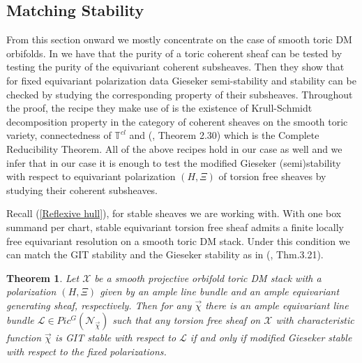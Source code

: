 \documentclass[10pt]{amsart}
\newtheorem{thm}[prop]{Theorem}
\newcommand{\sX}{{\mathcal X}}
\numberwithin{equation}{subsection}
\begin{document}
\subsection{Matching Stability}\label{GIT and Gieseker}
From this section onward we mostly concentrate on the case of smooth toric DM orbifolds.
In \cite{Koo2} we have that the purity of a toric coherent sheaf can be tested by testing the purity of the equivariant coherent subsheaves. Then  they show that for fixed equivariant polarization data Gieseker semi-stability and stability can be checked by studying the corresponding property of their subsheaves. Throughout the proof, the recipe they make use of is the existence of Krull-Schmidt decomposition property in the category of coherent sheaves on the smooth toric variety, connectedness of $\mathbb{T}^{cl}$ and (\cite{Per}, Theorem 2.30) which is the Complete Reducibility Theorem. All of the above recipes hold in our case as well and we infer that in our case it is enough to test the modified Gieseker (semi)stability with respect to equivariant polarization $(H,\Xi)$ of torsion free sheaves by studying their coherent subsheaves.\par
Recall (\ref{Reflexive hull}), for stable sheaves we are working with. With one box summand per chart, stable equivariant torsion free sheaf admits a finite locally free equivariant resolution on a smooth toric DM stack.
Under this condition we can match the GIT stability and the Gieseker stability as in (\cite{Koo2}, Thm.3.21).
\begin{thm}\label{Gieseker}
Let $\sX$ be a smooth projective orbifold toric DM stack with a polarization $(H,\Xi)$ given by an ample line bundle and an ample equivariant generating sheaf, respectively. Then for any $\vec\chi$ there is an ample equivariant line bundle $\mathscr{L}\in Pic^{G}(\mathscr{N}_{\vec\chi})$ such that any torsion free sheaf on $\sX$ with characteristic function $\vec\chi$ is GIT stable with respect to $\mathscr{L}$ if and only if modified Gieseker stable with respect to the fixed polarizations.
\end{thm}
\end{document}
